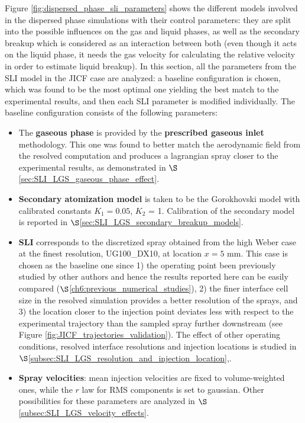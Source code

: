 Figure \ref{fig:dispersed_phase_sli_parameters} shows the different models involved in the dispersed phase simulations with their control parameters: they are split into the possible influences on the gas and liquid phases, as well as the secondary breakup which is considered as an interaction between both (even though it acts on the liquid phase, it needs the gas velocity for calculating the relative velocity in order to estimate liquid breakup). In this section, all the parameters from the SLI model in the JICF case are analyzed: a baseline configuration is chosen, which was found to be the most optimal one yielding the best match to the experimental results, and then each SLI parameter is modified individually. The baseline configuration consists of the following parameters:

\begin{itemize}

	\item The \textbf{gaseous phase} is provided by the \textbf{prescribed gaseous inlet} methodology. This one was found to better match the aerodynamic field from the resolved computation and produces a lagrangian spray closer to the experimental results, as demonstrated in $\S$\ref{sec:SLI_LGS_gaseous_phase_effect}.
	
	\item \textbf{Secondary atomization model} is taken to be the Gorokhovski model with calibrated constants $K_1 = 0.05$, $K_2$ = 1. Calibration of the secondary model is reported in $\S$\ref{sec:SLI_LGS_secondary_breakup_models}.
	
	\item \textbf{SLI} corresponds to the discretized spray obtained from the high Weber case at the finest resolution, UG100\_DX10, at location $x = 5$ mm. This case is chosen as the baseline one since 1) the operating point been previously studied by other authors and hence the results reported here can be easily compared ($\S$\ref{ch6:previous_numerical_studies}), 2) the finer interface cell size in the resolved simulation provides a better resolution of the sprays, and 3) the location closer to the injection point deviates less with respect to the experimental trajectory than the sampled spray further downstream (see Figure \ref{fig:JICF_trajectories_validation}). The effect of other operating conditions, resolved interface resolutions and injection locations is studied in $\S$\ref{subsec:SLI_LGS_resolution_and_injection_location},.
	
	\item \textbf{Spray velocities}: mean injection velocities are fixed to volume-weighted ones, while the $r$ law for RMS components is set to gaussian. Other possibilities for these parameters are analyzed in $\S$\ref{subsec:SLI_LGS_velocity_effects}.
	

\end{itemize}
